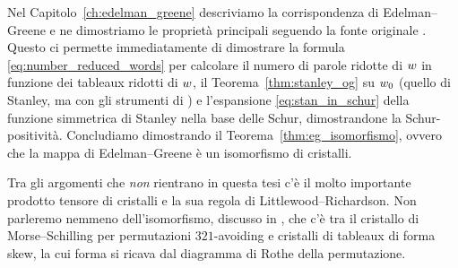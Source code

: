 Nel Capitolo~\ref{ch:edelman_greene} descriviamo la corrispondenza di Edelman--Greene
e ne dimostriamo le propriet\`a principali seguendo la fonte originale
\cite{edelman-greene-87}.
Questo ci permette immediatamente di dimostrare
la formula \eqref{eq:number_reduced_words} per calcolare il numero di parole ridotte di $w$
in funzione dei tableaux ridotti di $w$, il Teorema~\ref{thm:stanley_og} su $w_0$
(quello di Stanley, ma con gli strumenti di \cite{edelman-greene-87})
e l'espansione \eqref{eq:stan_in_schur} della funzione simmetrica di Stanley nella base 
delle Schur, dimostrandone la Schur-positivit\`a.
Concludiamo dimostrando il Teorema~\ref{thm:eg_isomorfismo}, ovvero che la
mappa di Edelman--Greene \`e un isomorfismo di cristalli.

Tra gli argomenti che \emph{non} rientrano in questa tesi c'\`e il molto importante
prodotto tensore di cristalli e la sua regola di Littlewood--Richardson.
Non parleremo nemmeno dell'isomorfismo, discusso in \cite[Proposition~4.3]{morse-schilling-15},
che c'\`e tra il cristallo di Morse--Schilling
per permutazioni $321$-avoiding e cristalli di tableaux di forma skew,
la cui forma si ricava dal diagramma di Rothe della permutazione.
